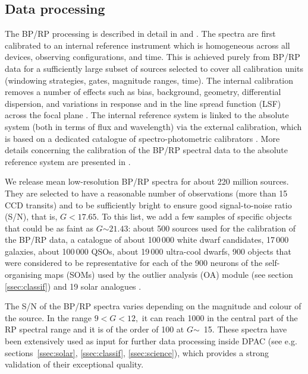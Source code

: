 \documentclass[longauth]{aa}
\providecommand{\bprp}{BP/RP\xspace}
\providecommand\gmag{\ensuremath{G}\xspace}
\begin{document}
\subsection{Data processing}\label{ssec:bprpproc} 
The \bprp processing is described in detail in \citet{EDR3-DPACP-118} and \citet{EDR3-DPACP-120}.
The spectra are first calibrated to an internal reference instrument which is homogeneous across all devices, observing configurations, and time. This is achieved purely from \bprp data for a sufficiently large subset of sources selected to cover all calibration units (windowing strategies, gates, magnitude ranges, time).  The internal calibration removes a number of  effects such as bias, background, geometry, differential dispersion, and variations in response and in the line spread function (LSF)  across the focal plane \citep{EDR3-DPACP-119, EDR3-DPACP-118}.
The internal reference system is linked to the absolute system (both in terms of flux and wavelength) via the external calibration, which is based on a dedicated catalogue of spectro-photometric calibrators \citep{2021MNRAS.503.3660P}.  More details concerning  the calibration of the \bprp spectral data to the absolute reference system are presented  in \citet{EDR3-DPACP-120}.  

We release mean low-resolution BP/RP spectra for about 220 million sources. They are selected to have a reasonable number of observations (more than 15 CCD transits) and to be
sufficiently bright to ensure good signal-to-noise ratio (S/N), that is, \gmag$<17.65$. To this list, we add a few samples of specific objects that could be as faint as \gmag$\sim 21.43$: about 500
sources used for the calibration of the BP/RP data, a catalogue of
about 100\,000  white dwarf candidates, 17\,000 galaxies, about 100\,000 QSOs,
about 19\,000 ultra-cool dwarfs, 900 objects that were considered
to be  representative for each of
the 900 neurons of the self-organising maps (SOMs) used by the outlier
analysis (OA) module (see section \ref{ssec:classif})  and  19 solar
analogues \citep{EDR3-DPACP-118}. 

The S/N of the \bprp spectra varies depending on the magnitude and colour of the source. In the range $9<$\gmag$<12,$ it can reach 1000 in the central part of the RP spectral range and it is of the order of 100 at \gmag$\sim$~15.
These spectra have been extensively used as input for further data processing inside DPAC (see e.g. sections~\ref{ssec:solar},  \ref{ssec:classif}, \ref{ssec:science}), which provides a strong validation of their exceptional quality.
\end{document}
